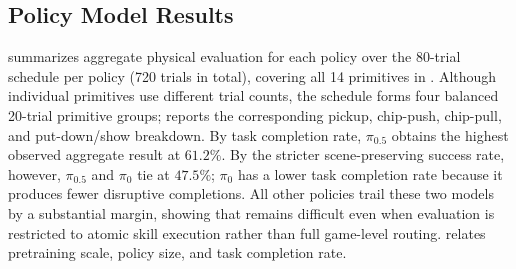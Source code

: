 \subsection{Policy Model Results}

 summarizes aggregate physical evaluation for each policy over the 80-trial schedule per policy (720 trials in total), covering all 14 primitives in .
Although individual primitives use different trial counts, the schedule forms four balanced 20-trial primitive groups;  reports the corresponding pickup, chip-push, chip-pull, and put-down/show breakdown. By task completion rate, $\pi_{0.5}$ obtains the highest observed aggregate result at $61.2\%$. By the stricter scene-preserving success rate, however, $\pi_{0.5}$ and $\pi_0$ tie at $47.5\%$; $\pi_0$ has a lower task completion rate because it produces fewer disruptive completions. All other policies trail these two models by a substantial margin, showing that \ours{} remains difficult even when evaluation is restricted to atomic skill execution rather than full game-level routing.
 relates pretraining scale, policy size, and task completion rate.



